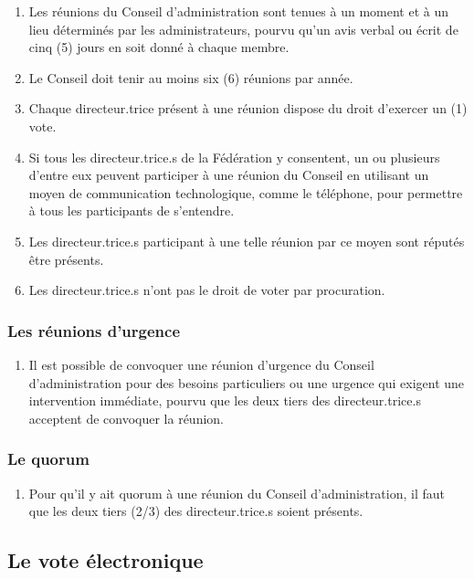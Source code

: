 \begin{enumerate}
 \item
  Les réunions du Conseil d'administration sont tenues à un moment et à un lieu déterminés par les administrateurs, pourvu qu'un avis verbal ou écrit de cinq (5) jours en soit donné à chaque membre.
 \item
  Le Conseil doit tenir au moins six (6) réunions par année.
 \item
  Chaque directeur.trice présent à une réunion dispose du droit d'exercer un (1) vote.
 \item
  Si tous les directeur.trice.s de la Fédération y consentent, un ou plusieurs d'entre eux peuvent participer à une réunion du Conseil en utilisant un moyen de communication technologique, comme le téléphone, pour permettre à tous les participants de s'entendre.
 \item
  Les directeur.trice.s participant à une telle réunion par ce moyen sont réputés être présents.
 \item
  Les directeur.trice.s n'ont pas le droit de voter par procuration.
\end{enumerate}

\subsubsection{Les réunions d'urgence}
\label{les-reunions-d-urgence}

\begin{enumerate}
 \item
  Il est possible de convoquer une réunion d'urgence du Conseil d'administration pour des besoins particuliers ou une urgence qui exigent une intervention immédiate, pourvu que les deux tiers des directeur.trice.s acceptent de convoquer la réunion.
\end{enumerate}

\subsubsection{Le quorum}
\label{le-quorum}

\begin{enumerate}
 \item
  Pour qu'il y ait quorum à une réunion du Conseil d'administration, il faut que les deux tiers (2/3) des directeur.trice.s soient présents.
\end{enumerate}

\subsection{Le vote électronique}
\label{le-vote-electronique}

